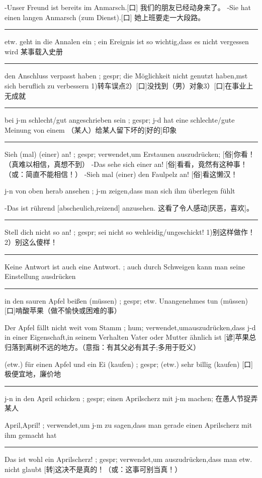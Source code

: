 -Unser Freund ist bereits im Anmarsch.[口] 我们的朋友已经动身来了。
-Sie hat einen langen Anmarsch (zum Dienst).[口] 她上班要走一大段路。

\noindent\rule{\textwidth}{1pt}  
etw. geht in die Annalen ein ; ein Ereignis ist so wichtig,dass es nicht vergessen wird 
某事载入史册

\noindent\rule{\textwidth}{1pt} 
den Anschluss verpasst haben ; gespr; die Möglichkeit nicht genutzt haben,mst sich beruflich zu verbessern
1)转车误点2）[口]没找到（男）对象3）[口]在事业上无成就

\noindent\rule{\textwidth}{1pt}  
bei j-m schlecht/gut angeschrieben sein ; gespr; j-d hat eine schlechte/gute Meinung von einem
（某人）给某人留下坏的[好的]印象

\noindent\rule{\textwidth}{1pt}  
Sieh (mal) (einer) an! ; gespr; verwendet,um Erstaunen auszudrücken;
[俗]你看！（真难以相信，真想不到）
-Das sehe sich einer an! [俗]看看，竟然有这种事！（或：简直不能相信！）
-Sieh mal (einer) den Faulpelz an! [俗]看这懒汉！

j-n von oben herab ansehen ; j-m zeigen,dass man sich ihm überlegen fühlt

-Das ist rührend [abscheulich,reizend] anzusehen. 这看了令人感动[厌恶，喜欢]。

\noindent\rule{\textwidth}{1pt}  
Stell dich nicht so an! ; gespr; sei nicht so wehleidig/ungeschickt!
1)别这样做作！2）别这么傻样！

\noindent\rule{\textwidth}{1pt}  
Keine Antwort ist auch eine Antwort. ; auch durch Schweigen kann man seine Einstellung ausdrücken

\noindent\rule{\textwidth}{1pt}  
in den sauren Apfel beißen (müssen) ; gespr; etw. Unangenehmes tun (müssen)
[口]啃酸苹果（做不愉快或困难的事）

Der Apfel fällt nicht weit vom Stamm ; hum; verwendet,umauszudrücken,dass j-d in einer Eigenschaft,in seinem Verhalten Vater oder Mutter ähnlich ist
[谚]苹果总归落到离树不远的地方。（意指：有其父必有其子;多用于贬义）

(etw.) für einen Apfel und ein Ei (kaufen) ; gespr; (etw.) sehr billig (kaufen)
[口]极便宜地，廉价地

\noindent\rule{\textwidth}{1pt}  
j-n in den April schicken ; gespr; einen Aprilscherz mit j-m machen;
在愚人节捉弄某人

April,April! ; verwendet,um j-m zu sagen,dass man gerade einen Aprilscherz mit ihm gemacht hat

\noindent\rule{\textwidth}{1pt}  
Das ist wohl ein Aprilscherz! ; gespr; verwendet,um auszudrücken,dass man etw. nicht glaubt
[转]这决不是真的！（或：这事可别当真！）

